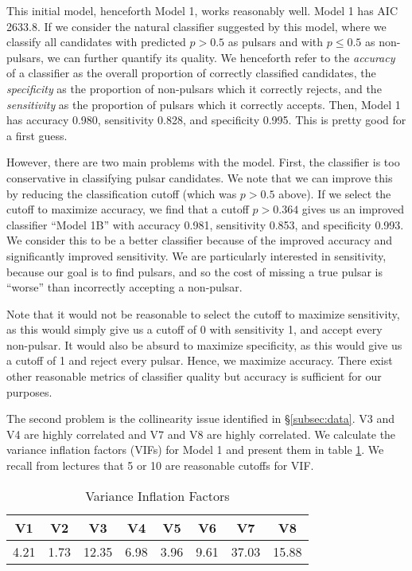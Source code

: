 \documentclass[11pt, oneside]{article}
\begin{document}
This initial model, henceforth Model 1, works reasonably well. Model 1 has AIC 2633.8. If we consider the natural classifier suggested by this model, where we classify all candidates with predicted $p > 0.5$ as pulsars and with $p \leq 0.5$ as non-pulsars, we can further quantify its quality. We henceforth refer to the \emph{accuracy} of a classifier as the overall proportion of correctly classified candidates, the \emph{specificity} as the proportion of non-pulsars which it correctly rejects, and the \emph{sensitivity} as the proportion of pulsars which it correctly accepts. Then, Model 1 has accuracy 0.980, sensitivity 0.828, and specificity 0.995.  This is pretty good for a first guess. 

However, there are two main problems with the model. First, the classifier is too conservative in classifying pulsar candidates. We note that we can improve this by reducing the classification cutoff (which was $p > 0.5$ above). If we select the cutoff to maximize accuracy, we find that a cutoff $p > 0.364$ gives us an improved classifier ``Model 1B'' with accuracy 0.981, sensitivity 0.853, and specificity 0.993. We consider this to be a better classifier because of the improved accuracy and significantly improved sensitivity. We are particularly interested in sensitivity, because our goal is to find pulsars, and so the cost of missing a true pulsar is ``worse'' than incorrectly accepting a non-pulsar. 

Note that it would not be reasonable to select the cutoff to maximize sensitivity, as this would simply give us a cutoff of 0 with sensitivity 1, and accept every non-pulsar. It would also be absurd to maximize specificity, as this would give us a cutoff of 1 and reject every pulsar. Hence, we maximize accuracy. There exist other reasonable metrics of classifier quality but accuracy is sufficient for our purposes. 

The second problem is the collinearity issue identified in \S\ref{subsec:data}. V3 and V4 are highly correlated and V7 and V8 are highly correlated. We calculate the variance inflation factors (VIFs) for Model 1 and present them in table \ref{table:vif}. We recall from lectures that 5 or 10 are reasonable cutoffs for VIF. 

\begin{table}%
\centering
\begin{tabular}{|c c c c c c c c|} 
 \hline
  V1  &  V2 &  V3 &   V4 &   V5&    V6  &  V7  &  V8 \\
  \hline
 4.21 & 1.73 &12.35 & 6.98 & 3.96 & 9.61& 37.03 &15.88 \\
  \hline
\end{tabular}
\caption{Variance Inflation Factors}
\label{table:vif}
\end{table}
\end{document}
